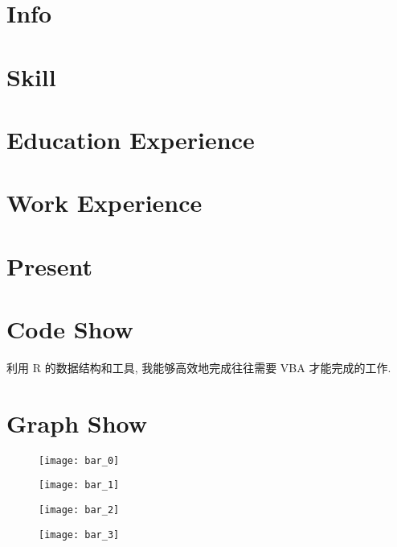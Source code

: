 \documentclass{article}
\begin{document}
	\section*{Info}
		
	\section*{Skill}
		
	\section*{Education Experience}
		
	\section*{Work Experience}
		
	\section*{Present}
		
	\section*{Code Show}
		利用 R 的数据结构和工具, 我能够高效地完成往往需要 VBA 才能完成的工作.
			
			
		
			
	\section*{Graph Show}
		\begin{figure}
		\begin{center}
		\texttt{[image: bar\_0]}
		\end{center}
		\end{figure}
		\begin{figure}
		\begin{center}
		\texttt{[image: bar\_1]}
		\end{center}
		\end{figure}
		\begin{figure}
		\begin{center}
		\texttt{[image: bar\_2]}
		\end{center}
		\end{figure}
		\begin{figure}
		\begin{center}
		\texttt{[image: bar\_3]}
		\end{center}
		\end{figure}
\end{document}
